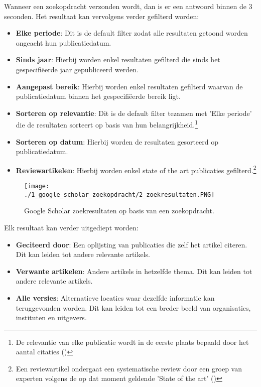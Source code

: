 Wanneer een zoekopdracht verzonden wordt, dan is er een antwoord binnen de 3 seconden. Het resultaat kan vervolgens verder gefilterd worden:
\begin{itemize}
    \item \textbf{Elke periode}: Dit is de default filter zodat alle resultaten getoond worden ongeacht hun publicatiedatum.
    \item \textbf{Sinds jaar}: Hierbij worden enkel resultaten gefilterd die sinds het gespecifiëerde jaar gepubliceerd werden.
    \item \textbf{Aangepast bereik}: Hierbij worden enkel resultaten gefilterd waarvan de publicatiedatum binnen het gespecifiëerde bereik ligt.
    \item \textbf{Sorteren op relevantie}: Dit is de default filter tezamen met 'Elke periode' die de resultaten sorteert op basis van hun belangrijkheid.\footnote{De relevantie van elke publicatie wordt in de eerste plaats bepaald door het aantal citaties (\autocite{Beel2009})}
    \item \textbf{Sorteren op datum}: Hierbij worden de resultaten gesorteerd op publicatiedatum.
    \item \textbf{Reviewartikelen}: Hierbij worden enkel state of the art publicaties gefilterd.\footnote{Een reviewartikel ondergaat een systematische review door een groep van experten volgens de op dat moment geldende 'State of the art' (\autocite{Sataloff2021})}
\end{itemize}

\begin{figure}
    \centering
    \texttt{[image: ./1\_google\_scholar\_zoekopdracht/2\_zoekresultaten.PNG]}
    \caption[Google Scholar zoekresultaten.]{\label{fig:Google Scholar zoekresultaten}Google Scholar zoekresultaten op basis van een zoekopdracht.}
\end{figure}

Elk resultaat kan verder uitgediept worden:
\begin{itemize}
    \item \textbf{Geciteerd door}: Een oplijsting van publicaties die zelf het artikel citeren. Dit kan leiden tot andere relevante artikels.
    \item \textbf{Verwante artikelen}: Andere artikels in hetzelfde thema. Dit kan leiden tot andere relevante artikels.
    \item \textbf{Alle versies}: Alternatieve locaties waar dezelfde informatie kan teruggevonden worden. Dit kan leiden tot een breder beeld van organisaties, instituten en uitgevers.
\end{itemize}
